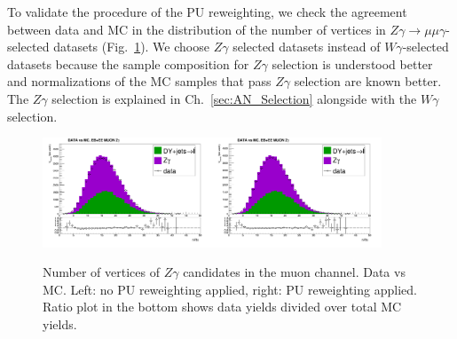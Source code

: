 

To validate the procedure of the PU reweighting, we check the agreement between data and MC in the distribution of the number of vertices in $Z\gamma\rightarrow\mu\mu\gamma$-selected datasets (Fig.~\ref{fig:DATAvsMC_nVtx}). We choose $Z\gamma$ selected datasets instead of $W\gamma$-selected datasets because the sample composition for $Z\gamma$ selection is understood better and normalizations of the MC samples that pass $Z\gamma$ selection are known better. The $Z\gamma$ selection is explained in Ch.~\ref{sec:AN_Selection} alongside with the $W\gamma$ selection.

\begin{figure}[htb]
  \begin{center}
   \includegraphics[width=0.45\textwidth]{../figs/figs_v11/MUON_ZGamma/PrepareYields/c_TotalDATAvsMC_EtaCommon__nVtx_noPU.png}\includegraphics[width=0.45\textwidth]{../figs/figs_v11/MUON_ZGamma/PrepareYields/c_TotalDATAvsMC_EtaCommon__nVtx.png}
  \caption{Number of vertices of $Z\gamma$ candidates in the muon channel. Data vs MC. Left: no PU reweighting applied, right: PU reweighting applied. Ratio plot in the bottom shows data yields divided over total MC yields.}
  \label{fig:DATAvsMC_nVtx}
  \end{center}
\end{figure}
